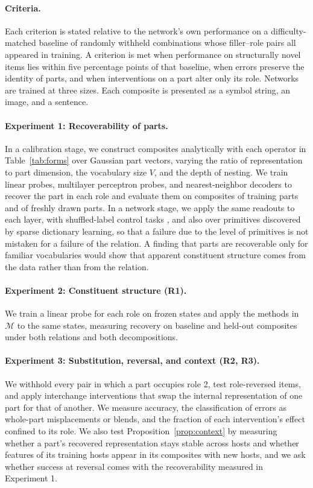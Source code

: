 \documentclass{article}
\theoremstyle{definition}
\theoremstyle{plain}
\theoremstyle{remark}
\begin{document}
\paragraph{Criteria.} Each criterion is stated relative to the
network's own performance on a difficulty-matched baseline of randomly
withheld combinations whose filler--role pairs all appeared in
training. A criterion is met when performance on structurally novel
items lies within five percentage points of that baseline, when errors
preserve the identity of parts, and when interventions on a part alter
only its role. Networks are trained at three sizes. Each composite is
presented as a symbol string, an image, and a sentence.

\paragraph{Experiment 1: Recoverability of parts.} In a calibration
stage, we construct composites analytically with each operator in
Table~\ref{tab:forms} over Gaussian part vectors, varying the ratio of
representation to part dimension, the vocabulary size $V$, and the
depth of nesting. We train linear probes, multilayer perceptron probes,
and nearest-neighbor decoders to recover the part in each role and
evaluate them on composites of training parts and of freshly drawn
parts. In a network stage, we apply the same readouts to each layer,
with shuffled-label control tasks \citep{hewitt2019}, and also over
primitives discovered by sparse dictionary learning, so that a failure
due to the level of primitives is not mistaken for a failure of the
relation. A finding that parts are recoverable only for familiar
vocabularies would show that apparent constituent structure comes from
the data rather than from the relation.

\paragraph{Experiment 2: Constituent structure (R1).} We train a linear
probe for each role on frozen states and apply the methods in
$\mathcal{M}$ to the same states, measuring recovery on baseline and
held-out composites under both relations and both decompositions.

\paragraph{Experiment 3: Substitution, reversal, and context (R2, R3).}
We withhold every pair in which a part occupies role 2, test
role-reversed items, and apply interchange interventions that swap the
internal representation of one part for that of another. We measure
accuracy, the classification of errors as whole-part misplacements or
blends, and the fraction of each intervention's effect confined to its
role. We also test Proposition~\ref{prop:context} by measuring whether
a part's recovered representation stays stable across hosts and
whether features of its training hosts appear in its composites with
new hosts, and we ask whether success at reversal comes with the
recoverability measured in Experiment 1.
\end{document}
